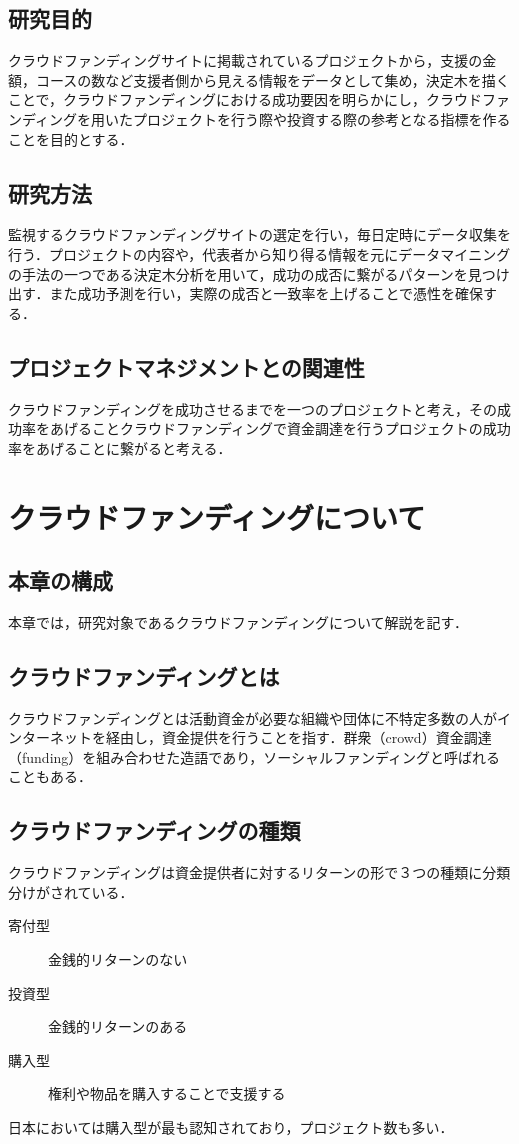 \section{研究目的}
 クラウドファンディングサイトに掲載されているプロジェクトから，支援の金額，コースの数など支援者側から見える情報をデータとして集め，決定木を描くことで，クラウドファンディングにおける成功要因を明らかにし，クラウドファンディングを用いたプロジェクトを行う際や投資する際の参考となる指標を作ることを目的とする．

\section{研究方法}
監視するクラウドファンディングサイトの選定を行い，毎日定時にデータ収集を行う．プロジェクトの内容や，代表者から知り得る情報を元にデータマイニングの手法の一つである決定木分析を用いて，成功の成否に繋がるパターンを見つけ出す．また成功予測を行い，実際の成否と一致率を上げることで憑性を確保する．

\section{プロジェクトマネジメントとの関連性}
クラウドファンディングを成功させるまでを一つのプロジェクトと考え，その成功率をあげることクラウドファンディングで資金調達を行うプロジェクトの成功率をあげることに繋がると考える．


\chapter{クラウドファンディングについて}
\section{本章の構成}
本章では，研究対象であるクラウドファンディングについて解説を記す．

\section{クラウドファンディングとは}
クラウドファンディングとは活動資金が必要な組織や団体に不特定多数の人がインターネットを経由し，資金提供を行うことを指す．群衆（crowd）資金調達（funding）を組み合わせた造語であり，ソーシャルファンディングと呼ばれることもある．

\section{クラウドファンディングの種類}
クラウドファンディングは資金提供者に対するリターンの形で３つの種類に分類分けがされている．
\begin{description}
 \item[寄付型] 金銭的リターンのない
 \item[投資型] 金銭的リターンのある
 \item[購入型] 権利や物品を購入することで支援する
\end{description}
日本においては購入型が最も認知されており，プロジェクト数も多い．

